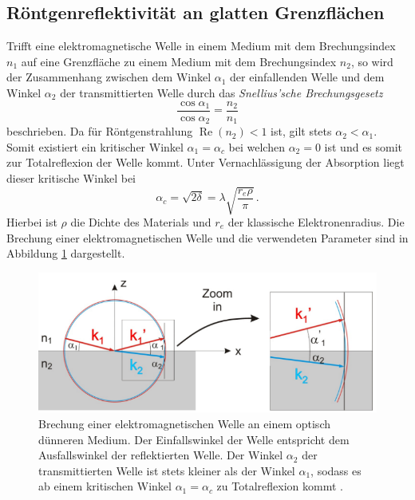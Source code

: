 \subsection*{Röntgenreflektivität an glatten Grenzflächen}
Trifft eine elektromagnetische Welle in einem Medium mit dem Brechungsindex $n_1$ auf eine Grenzfläche zu einem Medium mit dem Brechungsindex $n_2$, so wird der Zusammenhang zwischen dem Winkel $\alpha_1$ der einfallenden Welle und dem Winkel $\alpha_2$ der transmittierten Welle durch das \textit{Snellius'sche Brechungsgesetz}
\begin{equation*}
    \frac{\cos{\alpha_1}}{\cos{\alpha_2}}=\frac{n_2}{n_1}
\end{equation*}
beschrieben.
Da für Röntgenstrahlung $\operatorname{Re}(n_2)<1$ ist, gilt stets $\alpha_2 < \alpha_1$.
Somit existiert ein kritischer Winkel $\alpha_1 = \alpha_c$ bei welchen $\alpha_2=0$ ist und es somit zur Totalreflexion der Welle kommt.
Unter Vernachlässigung der Absorption liegt dieser kritische Winkel bei 
\begin{equation}
    \alpha_c = \sqrt{2\delta} = \lambda \sqrt{\frac{r_e \rho}{\pi}}\, .
    \label{eq:delta}
\end{equation}
Hierbei ist $\rho$ die Dichte des Materials und $r_e$ der klassische Elektronenradius.
Die Brechung einer elektromagnetischen Welle und die verwendeten Parameter sind in Abbildung \ref{fig:tfig1} dargestellt.
\begin{figure}[H]
\centering
\includegraphics[width=0.8\linewidth]{figures/Reflexion}
\caption{Brechung einer elektromagnetischen Welle an einem optisch dünneren Medium. 
Der Einfallswinkel der Welle entspricht dem Ausfallswinkel der reflektierten Welle. 
Der Winkel $\alpha_2$ der transmittierten Welle ist stets kleiner als der Winkel $\alpha_1$, sodass es ab einem kritischen Winkel $\alpha_1 = \alpha_c$ zu Totalreflexion kommt \cite{XSR}.}
\label{fig:tfig1}
\end{figure}

